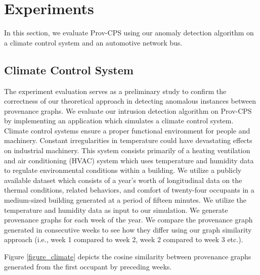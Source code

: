 
\chapter{Experiments}

In this section, we evaluate Prov-CPS using our anomaly detection algorithm on a climate control system and an automotive network bus.

\section{Climate Control System}
The experiment evaluation serves as a preliminary study to confirm the correctness of our theoretical approach in detecting anomalous instances between provenance graphs. We evaluate our intrusion detection algorithm on Prov-CPS by implementing an application which simulates a climate control system. Climate control systems ensure a proper functional environment for people and machinery. Constant irregularities in temperature could have devastating effects on industrial machinery. This system consists primarily of a heating ventilation and air conditioning (HVAC) system which uses temperature and humidity data to regulate environmental conditions within a building. We utilize a publicly available dataset \cite{LANGEVIN201594} which consists of a year's worth of longitudinal data on the thermal conditions, related behaviors, and comfort of twenty-four occupants in a medium-sized building generated at  a period of fifteen minutes. We utilize the temperature and humidity data as input to our simulation. We generate provenance graphs for each week of the year. We compare the provenance graph generated in consecutive weeks to see how they differ using our graph similarity approach (i.e., week 1 compared to week 2, week 2 compared to week 3 etc.). 
\par Figure \ref{figure_climate} depicts the cosine similarity between provenance graphs generated from the first occupant by preceding weeks. 


